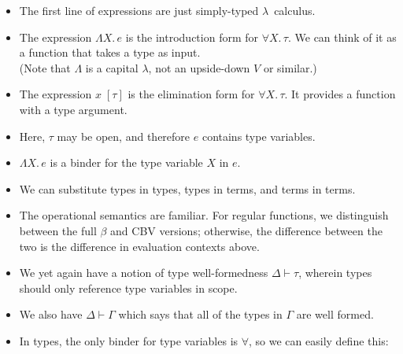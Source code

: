 \documentclass{lecturenotes}
\newcommand{\tabs}[3]{\ensuremath{\lambda #1 \colon #2.\,#3}}
\newcommand{\app}[2]{\ensuremath{#1\;#2}}
\newcommand{\fatype}[2]{\ensuremath{\forall #1.\,#2}}
\newcommand{\Abs}[2]{\Lambda #1.\,#2}
\newcommand{\App}[2]{#1\;[#2]}
\begin{document}
\begin{itemize}
\item The first line of expressions are just simply-typed $\lambda$~calculus.
\item The expression $\Abs{X}{e}$ is the introduction form for $\fatype{X}{\tau}$.
  We can think of it as a function that takes a type as input.\\
  (Note that $\Lambda$ is a capital $\lambda$, not an upside-down $V$ or similar.)
\item The expression $\App{x}{\tau}$ is the elimination form for $\fatype{X}{\tau}$.
  It provides a function with a type argument.
\item Here, $\tau$ may be open, and therefore $e$ contains type variables.
\item $\Abs{X}{e}$ is a binder for the type variable $X$ in $e$.
\item We can substitute types in types, types in terms, and terms in terms.
\item The operational semantics are familiar.
  For regular functions, we distinguish between the full $\beta$ and CBV versions; otherwise, the difference between the two is the difference in evaluation contexts above.
\end{itemize}


\begin{itemize}
\item We yet again have a notion of type well-formedness $\Delta \vdash \tau$, wherein types should only reference type variables in scope.
\item We also have $\Delta \vdash \Gamma$ which says that all of the types in $\Gamma$ are well formed.
\item In types, the only binder for type variables is $\forall$, so we can easily define this:
\end{itemize}

\end{document}
